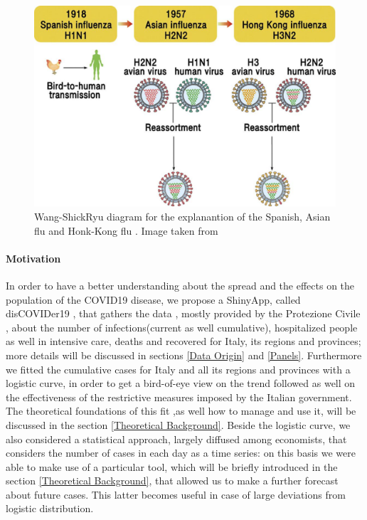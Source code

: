 \documentclass[
12pt, %
a4paper, %
oneside, %
headinclude,footinclude, %
BCOR5mm, %
]{scrartcl}
\begin{document}
\begin{figure}[h]
 \centering
 \includegraphics[width=0.8\linewidth]{Figures/Mixing_Flu.jpg} 
 \caption{Wang-ShickRyu diagram for the explanantion of the Spanish, Asian flu and Honk-Kong flu . Image taken from \cite{RYU2017195}}
 \label{Mixing_Flu}
\end{figure}




\paragraph{Motivation} \label{Motivation}
In order to have a better understanding about the spread and the effects on the population of the COVID19 disease, we propose a ShinyApp, called disCOVIDer19 , that gathers  the data , mostly provided by the Protezione Civile \cite{protezionecivile+git}, about the number of infections(current as well cumulative), hospitalized people as well in intensive care, deaths and recovered for Italy, its regions and provinces; more details will be discussed in sections \ref{Data Origin} and \ref{Panels}. Furthermore we fitted the cumulative cases for Italy and all its regions and provinces with a logistic curve, in order to get a bird-of-eye view on the trend followed as well on the effectiveness of the restrictive measures imposed by the Italian government. The theoretical foundations of this fit ,as well how to manage and use it, will be discussed in the section \ref{Theoretical Background}. Beside the logistic curve, we also considered a statistical approach, largely diffused among economists, that considers the number of cases in each day as a time series: on this basis we were able to make use of a particular tool, which will be briefly introduced in the section \ref{Theoretical Background}, that allowed us to  make a further forecast  about future cases.  This latter becomes useful in case of large deviations from logistic distribution. 
 
\end{document}
